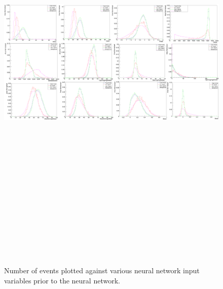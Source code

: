 \begin{landscape}
    \begin{figure}[t]
        \centering
        \hbox{\hspace{-0.5em}\includegraphics[width=24cm,height=21cm,keepaspectratio]{Figures/preNNvariablesbkg.PNG}}
        \caption{Number of events plotted against various neural network input variables prior to the neural network.}
        \label{fig:pre_NN_signal}
    \end{figure}
\end{landscape}

